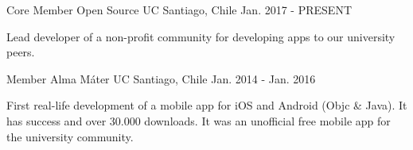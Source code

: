 \begin{cventries}
  \cventry
    {Core Member}
    {Open Source UC}
    {Santiago, Chile}
    {Jan. 2017 - PRESENT}
    {
      \begin{cvitems}
        \item {Lead developer of a non-profit community for developing apps to our university peers.}
      \end{cvitems}
    }
  \cventry
    {Member}
    {Alma Máter UC}
    {Santiago, Chile}
    {Jan. 2014 - Jan. 2016}
    {
      \begin{cvitems}
        \item {First real-life development of a mobile app for iOS and Android (Objc \& Java). It has success and over 30.000 downloads. It was an unofficial free mobile app for the university community.}
      \end{cvitems}
    }
\end{cventries}
